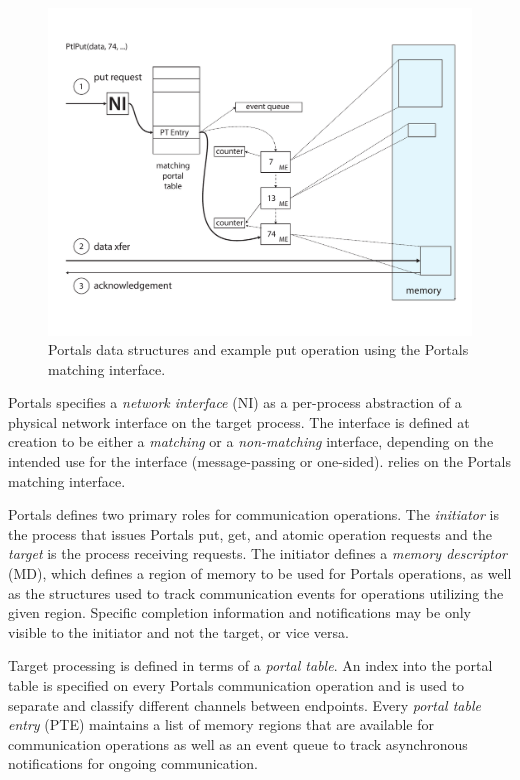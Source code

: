 \begin{figure}[ht]
  \centering
  \includegraphics[width=\linewidth]{figs/portals_put}
  \caption{Portals data structures and example put operation using the Portals matching interface.}
  \label{fig:portals_put}
\end{figure}


Portals specifies a {\em network interface} (NI) as a per-process
abstraction of a physical network interface on the target process. The
interface is defined at creation to be either a {\em matching}
or a {\em non-matching} interface, depending on the intended use for
the interface (message-passing or one-sided). \pdht relies on the
Portals matching interface.

Portals defines two primary roles for communication operations. The
{\em initiator} is the process that issues Portals put, get, and atomic operation
requests and the {\em target} is the process receiving
requests. The initiator defines a {\em memory descriptor} (MD), which defines a
region of memory to be used for Portals operations, as well as the
structures used to track communication events for operations utilizing the
given region.  Specific completion information
and notifications may be only visible to the initiator and not the
target, or vice versa.

Target processing is defined in terms of a {\em portal table}. An index into the
portal table is specified on every Portals communication operation and
is used to separate and classify different channels between endpoints.
Every {\em portal table entry} (PTE) maintains a list of memory regions that
are available for communication operations as well as an event queue
to track asynchronous notifications for ongoing communication.

